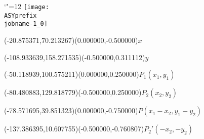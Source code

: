 \setlength{\unitlength}{1pt}%
\makeatletter%
\let\ASYencoding\f@encoding%
\let\ASYfamily\f@family%
\let\ASYseries\f@series%
\let\ASYshape\f@shape%
\makeatother%
{\catcode`"=12%
\texttt{[image: \\ASYprefix\\jobname-1\_0]}%
}%
%
\fontsize{9.000000}{10.800000}\selectfont%
\usefont{\ASYencoding}{\ASYfamily}{\ASYseries}{\ASYshape}%
\ASYalign(-20.875371,70.213267)(0.000000,-0.500000){$x$}%
%
\fontsize{9.000000}{10.800000}\selectfont%
\ASYalign(-108.933639,158.271535)(-0.500000,0.311112){$y$}%
%
\fontsize{9.000000}{10.800000}\selectfont%
\ASYalign(-50.118939,100.575211)(0.000000,0.250000){$P_1(x_1, y_1)$}%
%
\fontsize{9.000000}{10.800000}\selectfont%
\ASYalign(-80.480883,129.818779)(-0.500000,0.250000){$P_2(x_2, y_2)$}%
%
\fontsize{9.000000}{10.800000}\selectfont%
\ASYalign(-78.571695,39.851323)(0.000000,-0.750000){$P(x_1 - x_2, y_1 - y_2)$}%
%
\fontsize{9.000000}{10.800000}\selectfont%
\ASYalign(-137.386395,10.607755)(-0.500000,-0.760807){$P_2'(-x_2,- y_2)$}%
